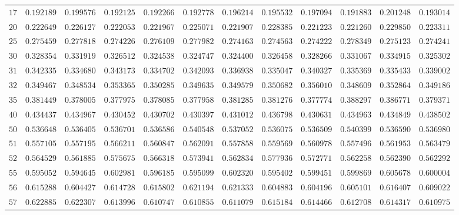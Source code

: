 \begin{sidewaystable}
\begin{tabular}{r|rrrrrrrrrrr}
$17$ & $0.192189$ & $0.199576$ & $0.192125$ & $0.192266$ & $0.192778$ & $0.196214$ & $0.195532$ & $0.197094$ & $0.191883$ & $0.201248$ & $0.193014$ \\
$20$ & $0.222649$ & $0.226127$ & $0.222053$ & $0.221967$ & $0.225071$ & $0.221907$ & $0.228385$ & $0.221223$ & $0.221260$ & $0.229850$ & $0.223311$ \\
$25$ & $0.275459$ & $0.277818$ & $0.274226$ & $0.276109$ & $0.277982$ & $0.274163$ & $0.274563$ & $0.274222$ & $0.278349$ & $0.275123$ & $0.274241$ \\
$30$ & $0.328354$ & $0.331919$ & $0.326512$ & $0.324538$ & $0.324747$ & $0.324400$ & $0.326458$ & $0.328266$ & $0.331067$ & $0.334915$ & $0.325302$ \\
$31$ & $0.342335$ & $0.334680$ & $0.343173$ & $0.334702$ & $0.342093$ & $0.336938$ & $0.335047$ & $0.340327$ & $0.335369$ & $0.335433$ & $0.339002$ \\
$32$ & $0.349467$ & $0.348534$ & $0.353365$ & $0.350285$ & $0.349635$ & $0.349579$ & $0.350682$ & $0.356010$ & $0.348609$ & $0.352864$ & $0.349186$ \\
$35$ & $0.381449$ & $0.378005$ & $0.377975$ & $0.378085$ & $0.377958$ & $0.381285$ & $0.381276$ & $0.377774$ & $0.388297$ & $0.386771$ & $0.379371$ \\
$40$ & $0.434437$ & $0.434967$ & $0.430452$ & $0.430702$ & $0.430397$ & $0.431012$ & $0.436798$ & $0.430631$ & $0.434963$ & $0.434849$ & $0.438502$ \\
$50$ & $0.536648$ & $0.536405$ & $0.536701$ & $0.536586$ & $0.540548$ & $0.537052$ & $0.536075$ & $0.536509$ & $0.540399$ & $0.536590$ & $0.536980$ \\
$51$ & $0.557105$ & $0.557195$ & $0.566211$ & $0.560847$ & $0.562091$ & $0.557858$ & $0.559569$ & $0.560978$ & $0.557496$ & $0.561953$ & $0.563479$ \\
$52$ & $0.564529$ & $0.561885$ & $0.575675$ & $0.566318$ & $0.573941$ & $0.562834$ & $0.577936$ & $0.572771$ & $0.562258$ & $0.562390$ & $0.562292$ \\
$55$ & $0.595052$ & $0.594645$ & $0.602981$ & $0.596185$ & $0.595099$ & $0.602320$ & $0.595402$ & $0.599451$ & $0.599869$ & $0.605678$ & $0.600004$ \\
$56$ & $0.615288$ & $0.604427$ & $0.614728$ & $0.615802$ & $0.621194$ & $0.621333$ & $0.604883$ & $0.604196$ & $0.605101$ & $0.616407$ & $0.609022$ \\
$57$ & $0.622885$ & $0.622307$ & $0.613996$ & $0.610747$ & $0.610855$ & $0.611079$ & $0.615184$ & $0.614466$ & $0.612708$ & $0.614317$ & $0.610975$ \\

\end{tabular}
\end{sidewaystable}
